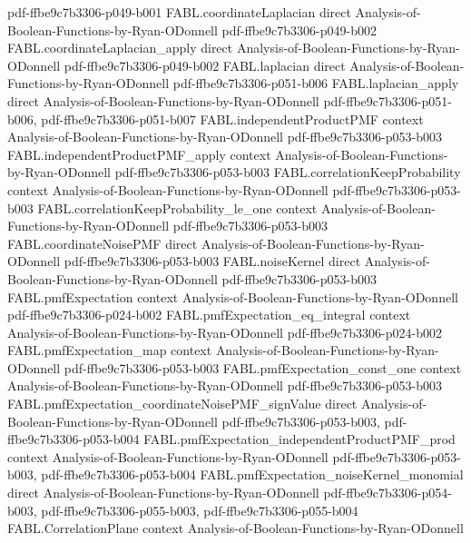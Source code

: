\begin{theorem}
  {pdf-ffbe9c7b3306-p049-b001}
\proofstep
  {FABL.coordinateLaplacian}
  {direct}
  {Analysis-of-Boolean-Functions-by-Ryan-ODonnell}
  {pdf-ffbe9c7b3306-p049-b002}
\proofstep
  {FABL.coordinateLaplacian_apply}
  {direct}
  {Analysis-of-Boolean-Functions-by-Ryan-ODonnell}
  {pdf-ffbe9c7b3306-p049-b002}
\proofstep
  {FABL.laplacian}
  {direct}
  {Analysis-of-Boolean-Functions-by-Ryan-ODonnell}
  {pdf-ffbe9c7b3306-p051-b006}
\proofstep
  {FABL.laplacian_apply}
  {direct}
  {Analysis-of-Boolean-Functions-by-Ryan-ODonnell}
  {pdf-ffbe9c7b3306-p051-b006,
    pdf-ffbe9c7b3306-p051-b007}
\proofstep
  {FABL.independentProductPMF}
  {context}
  {Analysis-of-Boolean-Functions-by-Ryan-ODonnell}
  {pdf-ffbe9c7b3306-p053-b003}
\proofstep
  {FABL.independentProductPMF_apply}
  {context}
  {Analysis-of-Boolean-Functions-by-Ryan-ODonnell}
  {pdf-ffbe9c7b3306-p053-b003}
\proofstep
  {FABL.correlationKeepProbability}
  {context}
  {Analysis-of-Boolean-Functions-by-Ryan-ODonnell}
  {pdf-ffbe9c7b3306-p053-b003}
\proofstep
  {FABL.correlationKeepProbability_le_one}
  {context}
  {Analysis-of-Boolean-Functions-by-Ryan-ODonnell}
  {pdf-ffbe9c7b3306-p053-b003}
\proofstep
  {FABL.coordinateNoisePMF}
  {direct}
  {Analysis-of-Boolean-Functions-by-Ryan-ODonnell}
  {pdf-ffbe9c7b3306-p053-b003}
\proofstep
  {FABL.noiseKernel}
  {direct}
  {Analysis-of-Boolean-Functions-by-Ryan-ODonnell}
  {pdf-ffbe9c7b3306-p053-b003}
\proofstep
  {FABL.pmfExpectation}
  {context}
  {Analysis-of-Boolean-Functions-by-Ryan-ODonnell}
  {pdf-ffbe9c7b3306-p024-b002}
\proofstep
  {FABL.pmfExpectation_eq_integral}
  {context}
  {Analysis-of-Boolean-Functions-by-Ryan-ODonnell}
  {pdf-ffbe9c7b3306-p024-b002}
\proofstep
  {FABL.pmfExpectation_map}
  {context}
  {Analysis-of-Boolean-Functions-by-Ryan-ODonnell}
  {pdf-ffbe9c7b3306-p053-b003}
\proofstep
  {FABL.pmfExpectation_const_one}
  {context}
  {Analysis-of-Boolean-Functions-by-Ryan-ODonnell}
  {pdf-ffbe9c7b3306-p053-b003}
\proofstep
  {FABL.pmfExpectation_coordinateNoisePMF_signValue}
  {direct}
  {Analysis-of-Boolean-Functions-by-Ryan-ODonnell}
  {pdf-ffbe9c7b3306-p053-b003,
    pdf-ffbe9c7b3306-p053-b004}
\proofstep
  {FABL.pmfExpectation_independentProductPMF_prod}
  {context}
  {Analysis-of-Boolean-Functions-by-Ryan-ODonnell}
  {pdf-ffbe9c7b3306-p053-b003,
    pdf-ffbe9c7b3306-p053-b004}
\proofstep
  {FABL.pmfExpectation_noiseKernel_monomial}
  {direct}
  {Analysis-of-Boolean-Functions-by-Ryan-ODonnell}
  {pdf-ffbe9c7b3306-p054-b003,
    pdf-ffbe9c7b3306-p055-b003,
    pdf-ffbe9c7b3306-p055-b004}
\proofstep
  {FABL.CorrelationPlane}
  {context}
  {Analysis-of-Boolean-Functions-by-Ryan-ODonnell}

\end{theorem}
